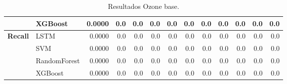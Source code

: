 \begin{table}[h]
\begin{adjustbox}{max width=11cm}
\begin{tabular}{|c|l|r|r|r|r|r|r|r|r|r|r|r|}
			& XGBoost &  0.0000 &  0.0 &  0.0 &  0.0 &  0.0 &  0.0 &  0.0 &  0.0 &  0.0 &  0.0 &  0.0 \\
			\hline
			\textbf{Recall} & LSTM &  0.0000 &  0.0 &  0.0 &  0.0 &  0.0 &  0.0 &  0.0 &  0.0 &  0.0 &  0.0 &  0.0 \\
			& SVM &  0.0000 &  0.0 &  0.0 &  0.0 &  0.0 &  0.0 &  0.0 &  0.0 &  0.0 &  0.0 &  0.0 \\
			& RandomForest &  0.0000 &  0.0 &  0.0 &  0.0 &  0.0 &  0.0 &  0.0 &  0.0 &  0.0 &  0.0 &  0.0 \\
			& XGBoost &  0.0000 &  0.0 &  0.0 &  0.0 &  0.0 &  0.0 &  0.0 &  0.0 &  0.0 &  0.0 &  0.0 \\
			\hline
		\end{tabular}
	\end{adjustbox}
	\caption{Resultados Ozone base.}
	\label{tab:Ozone_base}
\end{table}
\newpage
